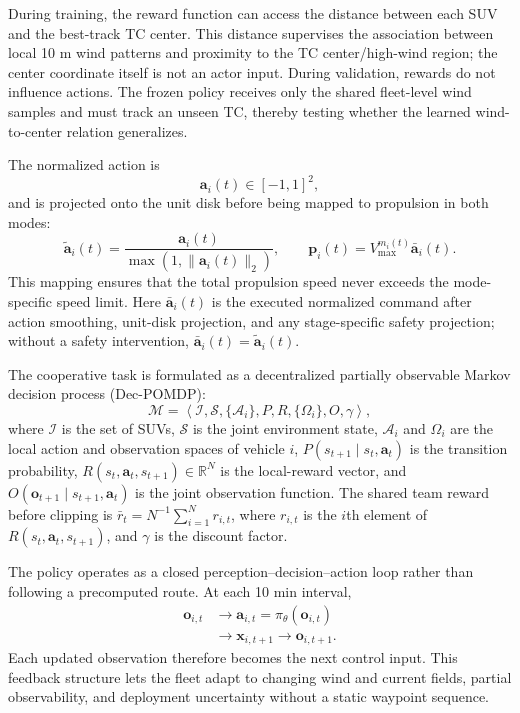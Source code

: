 \documentclass[a4paper,fleqn]{cas-dc}
\begin{document}
During training, the reward function can access the distance between each SUV
and the best-track TC center. This distance supervises the association between
local 10 m wind patterns and proximity to the TC center/high-wind region; the
center coordinate itself is not an actor input. During validation, rewards do
not influence actions. The frozen policy receives only the shared fleet-level
wind samples and must track an unseen TC, thereby testing whether the learned
wind-to-center relation generalizes.

The normalized action is
\begin{equation}
\mathbf{a}_i(t)\in[-1,1]^2,
\end{equation}
and is projected onto the unit disk before being mapped to propulsion in both
modes:
\begin{equation}
\tilde{\mathbf{a}}_i(t)=
\frac{\mathbf{a}_i(t)}
{\max\left(1,\|\mathbf{a}_i(t)\|_2\right)},\qquad
\mathbf{p}_i(t)=
V_{\max}^{m_i(t)}\bar{\mathbf{a}}_i(t).
\label{eq:normalized_action}
\end{equation}
This mapping ensures that the total propulsion speed never exceeds the
mode-specific speed limit. Here \(\bar{\mathbf{a}}_i(t)\) is the executed
normalized command after action smoothing, unit-disk projection, and any
stage-specific safety projection; without a safety intervention,
\(\bar{\mathbf{a}}_i(t)=\tilde{\mathbf{a}}_i(t)\).

The cooperative task is formulated as a decentralized partially observable
Markov decision process (Dec-POMDP):
\begin{equation}
\mathcal{M}=
\left\langle
\mathcal{I},
\mathcal{S},
\{\mathcal{A}_i\},
P,
R,
\{\Omega_i\},
O,
\gamma
\right\rangle,
\label{eq:decpomdp}
\end{equation}
where $\mathcal{I}$ is the set of SUVs, $\mathcal{S}$ is the joint environment
state, $\mathcal{A}_i$ and $\Omega_i$ are the local action and observation
spaces of vehicle $i$,
$P(s_{t+1}\mid s_t,\mathbf{a}_t)$ is the transition probability,
$R(s_t,\mathbf{a}_t,s_{t+1})\in\mathbb{R}^{N}$ is the local-reward vector, and
$O(\mathbf{o}_{t+1}\mid s_{t+1},\mathbf{a}_t)$ is the joint observation
function. The shared team reward before clipping is
$\bar r_t=N^{-1}\sum_{i=1}^{N}r_{i,t}$, where
$r_{i,t}$ is the $i$th element of
$R(s_t,\mathbf{a}_t,s_{t+1})$, and $\gamma$ is the discount factor.

The policy operates as a closed perception--decision--action loop rather than
following a precomputed route. At each 10 min interval,
\begin{equation}
\begin{aligned}
\mathbf{o}_{i,t}
&\longrightarrow
\mathbf{a}_{i,t}=\pi_\theta(\mathbf{o}_{i,t})\\
&\longrightarrow
\mathbf{x}_{i,t+1}
\longrightarrow
\mathbf{o}_{i,t+1}.
\end{aligned}
\label{eq:closed_loop}
\end{equation}
Each updated observation therefore becomes the next control input. This
feedback structure lets the fleet adapt to changing wind and current fields,
partial observability, and deployment uncertainty without a static waypoint
sequence.
\end{document}
